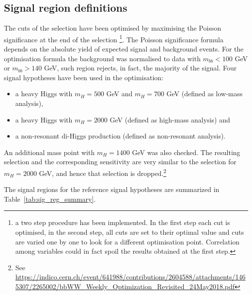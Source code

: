 \subsection{Signal region definitions}
\label{subsec:SR}
The cuts of the selection have been optimised by maximising the Poisson
significance at the end of the selection \footnote{a two step procedure has
been implemented. In the first step each cut is optimised, in the second step,
all cuts are set to their optimal value and cuts are varied one by one to
look for a different optimisation point. Correlation among variables 
could in fact spoil the results obtained at the first step.}. The Poisson
significance formula depends on the absolute yield of expected signal and
background events. For the optimisation formula the \ttbar background was
normalised to data with $m_{bb} < 100$ GeV or $m_{bb} > 140$ GeV, 
such region rejects, in fact, the majority of the signal. Four signal
hypotheses have been used in the optimisation:
\begin{itemize}
\item{ a heavy Higgs with $m_H = 500$ GeV and $m_H = 700$ GeV (defined as low-mass analysis)},
\item{ a heavy Higgs with $m_H = 2000$ GeV (defined as high-mass analysis) and}
\item{ a non-resonant di-Higgs production (defined as non-resonant analysis).}
\end{itemize}
An additional mass point with $m_H = 1400$ GeV was also checked. The resulting selection and the corresponding sensitivity are very similar to the selection for $m_H = 2000$ GeV, and hence that selection is dropped.{\footnote {See \url {https://indico.cern.ch/event/641988/contributions/2604588/attachments/1465307/2265002/bbWW_Weekly_Optimization_Revisited_24May2018.pdf}}} 

The signal regions for the  reference signal hypotheses are summarized in 
Table~\ref{tab:sig_reg_summary}.


